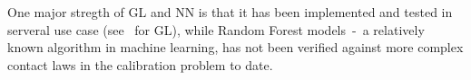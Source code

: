 One major stregth of GL and NN is that it has been implemented and tested in serveral use case (see~\cite{gl-performancestudy,gl-quantification} for GL), while Random Forest models~-~a relatively known algorithm in machine learning, has not been verified against more complex contact laws in the calibration problem to date. 